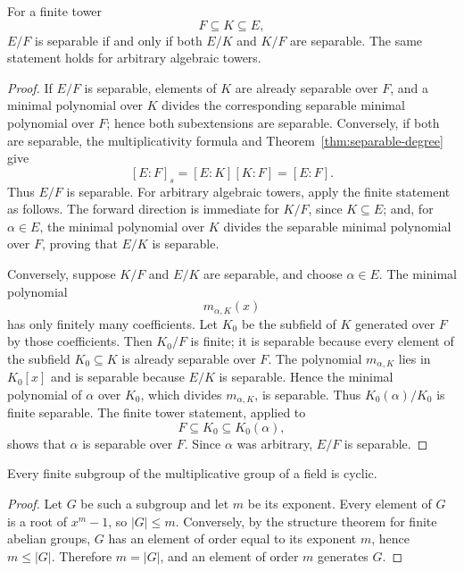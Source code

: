 \begin{proposition}\label{prop:separable-towers}
For a finite tower
\[
F\subseteq K\subseteq E,
\]
\(E/F\) is separable if and only if both \(E/K\) and \(K/F\) are separable.
The same statement holds for arbitrary algebraic towers.
\end{proposition}
\begin{proof}
If \(E/F\) is separable, elements of \(K\) are already separable over
\(F\), and a minimal polynomial over \(K\) divides the corresponding
separable minimal polynomial over \(F\); hence both subextensions are
separable.  Conversely, if both are separable, the multiplicativity formula
and Theorem~\ref{thm:separable-degree} give
\[
[E:F]_s=[E:K][K:F]=[E:F].
\]
Thus \(E/F\) is separable.  For arbitrary algebraic towers, apply the finite
statement as follows.  The forward direction is immediate for \(K/F\), since
\(K\subseteq E\); and, for \(\alpha\in E\), the minimal polynomial over
\(K\) divides the separable minimal polynomial over \(F\), proving that
\(E/K\) is separable.

Conversely, suppose \(K/F\) and \(E/K\) are separable, and choose
\(\alpha\in E\).  The minimal polynomial
\[
m_{\alpha,K}(x)
\]
has only finitely many coefficients.  Let \(K_0\) be the subfield of \(K\)
generated over \(F\) by those coefficients.  Then \(K_0/F\) is finite; it is
separable because every element of the subfield \(K_0\subseteq K\) is already
separable over \(F\).  The polynomial \(m_{\alpha,K}\) lies in \(K_0[x]\) and is
separable because \(E/K\) is separable.  Hence the minimal polynomial of
\(\alpha\) over \(K_0\), which divides \(m_{\alpha,K}\), is separable.
Thus \(K_0(\alpha)/K_0\) is finite separable.  The finite tower statement,
applied to
\[
F\subseteq K_0\subseteq K_0(\alpha),
\]
shows that \(\alpha\) is separable over \(F\).  Since \(\alpha\) was
arbitrary, \(E/F\) is separable.
\end{proof}

\begin{lemma}\label{lem:finite-mult-cyclic}
Every finite subgroup of the multiplicative group of a field is cyclic.
\end{lemma}
\begin{proof}
Let \(G\) be such a subgroup and let \(m\) be its exponent.  Every element
of \(G\) is a root of \(x^m-1\), so \(|G|\leq m\).  Conversely, by the
structure theorem for finite abelian groups, \(G\) has an element of order
equal to its exponent \(m\), hence \(m\leq|G|\).  Therefore \(m=|G|\), and
an element of order \(m\) generates \(G\).
\end{proof}

